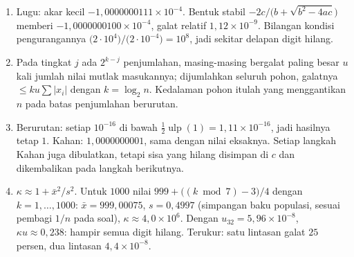 \begin{enumerate}[label=\textbf{22.\arabic*}]
  \item Lugu: akar kecil $-1{,}0000000111\times10^{-4}$. Bentuk stabil
        $-2c/\bigl(b+\sqrt{b^{2}-4ac}\bigr)$ memberi
        $-1{,}0000000100\times10^{-4}$, galat relatif $1{,}12\times10^{-9}$.
        Bilangan kondisi pengurangannya $\bigl(2\cdot10^{4}\bigr)/\bigl(2\cdot
        10^{-4}\bigr)=10^{8}$, jadi sekitar delapan digit hilang.

  \item Pada tingkat $j$ ada $2^{k-j}$ penjumlahan, masing-masing bergalat paling besar
        $u$ kali jumlah nilai mutlak masukannya; dijumlahkan seluruh pohon, galatnya
        $\le ku\sum|x_{i}|$ dengan $k=\log_{2}n$. Kedalaman pohon itulah yang
        menggantikan $n$ pada batas penjumlahan berurutan.

  \item Berurutan: setiap $10^{-16}$ di bawah $\tfrac12\operatorname{ulp}(1)
        =1{,}11\times10^{-16}$, jadi hasilnya tetap $1$. Kahan:
        $1{,}0000000001$, sama dengan nilai eksaknya. Setiap langkah Kahan juga
        dibulatkan, tetapi sisa yang hilang disimpan di $c$ dan dikembalikan pada
        langkah berikutnya.

  \item $\kappa\approx1+\bar x^{2}/s^{2}$. Untuk $1000$ nilai
        $999+\bigl((k\bmod7)-3\bigr)/4$ dengan $k=1,\dots,1000$:
        $\bar x=999{,}00075$, $s=0{,}4997$ (simpangan baku populasi, sesuai
        pembagi $1/n$ pada soal),
        $\kappa\approx4{,}0\times10^{6}$. Dengan $u_{32}=5{,}96\times10^{-8}$,
        $\kappa u\approx0{,}238$: hampir semua digit hilang. Terukur: satu lintasan
        galat $25$ persen, dua lintasan $4{,}4\times10^{-8}$.
\end{enumerate}

